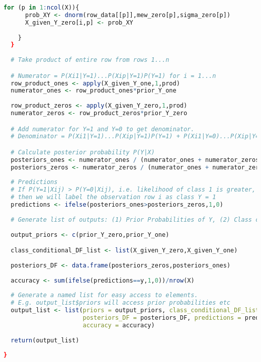 \documentclass{article}
\begin{document}
\begin{lstlisting}[language=R]
    for (p in 1:ncol(X)){
      prob_XY <- dnorm(row_data[[p]],mew_zero[p],sigma_zero[p])
      X_given_Y_zero[i,p] <- prob_XY
      
    }    
  }
  
  # Take product of entire row from rows 1...n

  # Numerator = P(Xi1|Y=1)...P(Xip|Y=1)P(Y=1) for i = 1...n
  row_product_ones <- apply(X_given_Y_one,1,prod) 
  numerator_ones <- row_product_ones*prior_Y_one
  
  row_product_zeros <- apply(X_given_Y_zero,1,prod)
  numerator_zeros <- row_product_zeros*prior_Y_zero 

  # Add numerator for Y=1 and Y=0 to get denominator.
  # Denominator = P(Xi1|Y=1)...P(Xip|Y=1)P(Y=1) + P(Xi1|Y=0)...P(Xip|Y=1)P(Y=0)

  # Calculate posterior probability P(Y|X)  
  posteriors_ones <- numerator_ones / (numerator_ones + numerator_zeros)
  posteriors_zeros <- numerator_zeros / (numerator_ones + numerator_zeros)
  
  # Predictions
  # If P(Y=1|Xij) > P(Y=0|Xij), i.e. likelihood of class 1 is greater, 
  # then we will label the observation row i as class Y = 1
  predictions <- ifelse(posteriors_ones>posteriors_zeros,1,0)
  
  # Generate list of outputs: (1) Prior Probabilities of Y, (2) Class conditional probabilities P(Xij|Y=k), (3) Posterior probabilities, (4) Predicted Labels for each data row, (5) accuracy
  
  output_priors <- c(prior_Y_zero,prior_Y_one)

  class_conditional_DF_list <- list(X_given_Y_zero,X_given_Y_one)
  
  posteriors_DF <- data.frame(posteriors_zeros,posteriors_ones)
  
  accuracy <- sum(ifelse(predictions==y,1,0))/nrow(X)
  
  # Generate a named list for easy access to elements. 
  # E.g. output_list$priors will access prior probabilities etc
  output_list <- list(priors = output_priors, class_conditional_DF_list = class_conditional_DF_list,
                      posteriors_DF = posteriors_DF, predictions = predictions,
                      accuracy = accuracy)
  
  return(output_list)
  
}
\end{lstlisting}

\newpage
\end{document}
